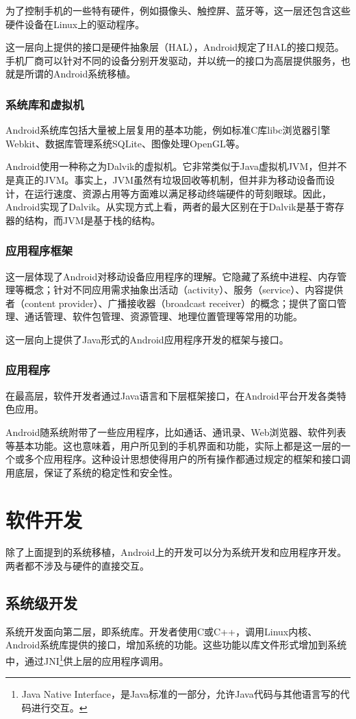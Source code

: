 为了控制手机的一些特有硬件，例如摄像头、触控屏、蓝牙等，这一层还包含这些硬件设备在Linux上的驱动程序。

这一层向上提供的接口是硬件抽象层（HAL），Android规定了HAL的接口规范。手机厂商可以针对不同的设备分别开发驱动，并以统一的接口为高层提供服务，也就是所谓的Android系统移植。

\subsubsection{系统库和虚拟机}
Android系统库包括大量被上层复用的基本功能，例如标准C库libc浏览器引擎Webkit、数据库管理系统SQLite、图像处理OpenGL等。

Android使用一种称之为Dalvik的虚拟机。它非常类似于Java虚拟机JVM，但并不是真正的JVM。事实上，JVM虽然有垃圾回收等机制，但并非为移动设备而设计，在运行速度、资源占用等方面难以满足移动终端硬件的苛刻眼球。因此，Android实现了Dalvik。从实现方式上看，两者的最大区别在于Dalvik是基于寄存器的结构，而JVM是基于栈的结构。

\subsubsection{应用程序框架}
这一层体现了Android对移动设备应用程序的理解。它隐藏了系统中进程、内存管理等概念；针对不同应用需求抽象出活动（activity）、服务（service）、内容提供者（content provider）、广播接收器（broadcast receiver）的概念；提供了窗口管理、通话管理、软件包管理、资源管理、地理位置管理等常用的功能。

这一层向上提供了Java形式的Android应用程序开发的框架与接口。

\subsubsection{应用程序}
在最高层，软件开发者通过Java语言和下层框架接口，在Android平台开发各类特色应用。

Android随系统附带了一些应用程序，比如通话、通讯录、Web浏览器、软件列表等基本功能。这也意味着，用户所见到的手机界面和功能，实际上都是这一层的一个或多个应用程序。这种设计思想使得用户的所有操作都通过规定的框架和接口调用底层，保证了系统的稳定性和安全性。

\section{软件开发}
除了上面提到的系统移植，Android上的开发可以分为系统开发和应用程序开发。两者都不涉及与硬件的直接交互。

\subsection{系统级开发}
系统开发面向第二层，即系统库。开发者使用C或C++，调用Linux内核、Android系统库提供的接口，增加系统的功能。这些功能以库文件形式增加到系统中，通过JNI\footnote{Java Native Interface，是Java标准的一部分，允许Java代码与其他语言写的代码进行交互。}供上层的应用程序调用。

